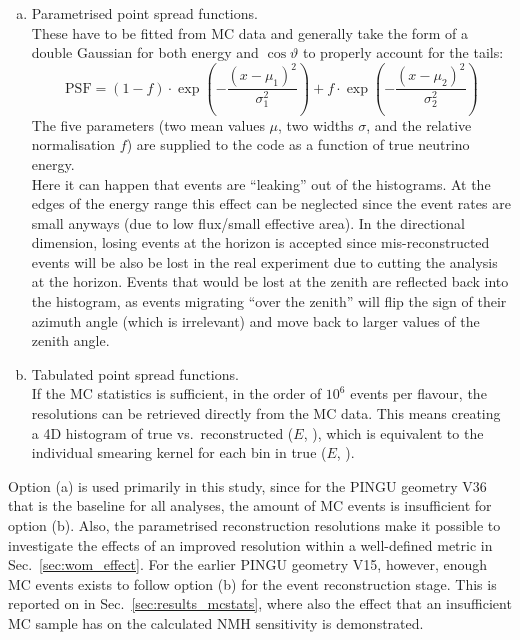 \begin{enumerate}[(a)]
 \item Parametrised point spread functions.\\ These have to be fitted from MC
  data and generally take the form of a double Gaussian for both energy and
  $\cos\vartheta$ to properly account for the tails:
  \begin{equation}
   \mathrm{PSF} = (1-f)\cdot \exp\left(-\frac{(x-\mu_1)^2}{\sigma_1^2}\right)
                  + f\cdot \exp\left(-\frac{(x-\mu_2)^2}{\sigma_2^2}\right)
   \label{eqn:reco_param}
  \end{equation}
  The five parameters (two mean values $\mu$, two widths $\sigma$, and the
  relative normalisation $f$) are supplied to the code as a function of true
  neutrino energy.\\
  Here it can happen that events are ``leaking'' out of the histograms. At
  the edges of the energy range this effect can be neglected since the event
  rates are small anyways (due to low flux/small effective area). In the
  directional dimension, losing events at the horizon is accepted since
  mis-reconstructed events will be also be lost in the real experiment due to
  cutting the analysis at the horizon. Events that would be lost at the zenith
  are reflected back into the histogram, as events migrating ``over the
  zenith'' will flip the sign of their azimuth angle (which is irrelevant) and
  move back to larger values of the zenith angle.
 \item Tabulated point spread functions.\\ If the MC statistics is sufficient,
  \ie in the order of $10^6$ events per flavour, the resolutions can be
  retrieved directly from the MC data. This means creating a 4D histogram of
  true vs.\ reconstructed ($E$, \coszen), which is equivalent to
  the individual smearing kernel for each bin in true ($E$, \coszen).
  \end{enumerate}
Option (a) is used primarily in this study, since for the PINGU geometry
V36 that is the baseline for all analyses, the amount of MC events is
insufficient for option (b). Also, the parametrised reconstruction resolutions
make it possible to investigate the effects of an improved resolution within a
well-defined metric in Sec.~\ref{sec:wom_effect}.
For the earlier PINGU geometry V15, however, enough MC events exists to
follow option (b) for the event reconstruction stage.
This is reported on in Sec.~\ref{sec:results_mcstats}, where also the effect
that an insufficient MC sample has on the calculated NMH sensitivity is
demonstrated.

